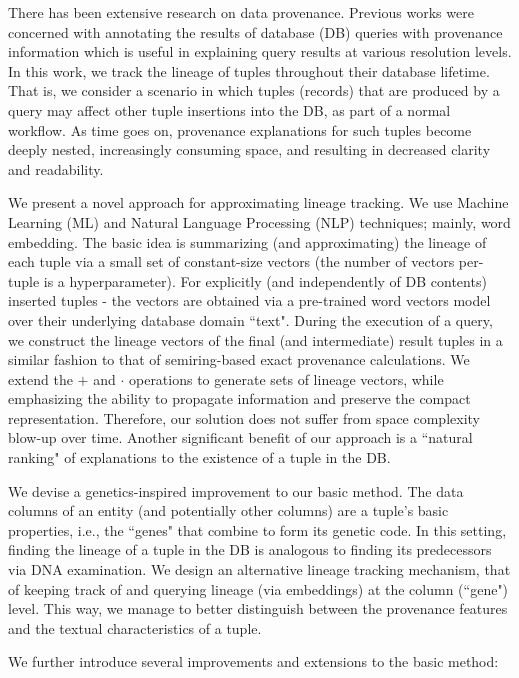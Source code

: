 {There has been extensive research on data provenance. Previous works were concerned with annotating the results of database (DB) queries with provenance information which is useful in explaining query results at various resolution levels. In this work, we track the lineage of tuples throughout their database lifetime. That is, we consider a scenario in which tuples (records) that are produced by a query may affect other tuple insertions into the DB, as part of a normal workflow. As time goes on, provenance explanations for such tuples become deeply nested, increasingly consuming  space, and resulting in decreased clarity and readability.
\par We present a novel approach for approximating lineage tracking. We use Machine Learning (ML) and Natural Language Processing (NLP) techniques; mainly, word embedding. 
The basic idea is summarizing (and approximating) the lineage of each tuple via a small set of constant-size vectors (the number of vectors per-tuple is a hyperparameter). For explicitly (and independently of DB contents)  inserted tuples -  the vectors are obtained via a pre-trained word vectors model over their underlying database domain ``text". During the execution of a query, we construct the lineage vectors of the final (and intermediate) result tuples in a similar fashion to that of semiring-based exact provenance calculations. We extend the $+$ and $\cdot$ operations to generate sets of lineage vectors, while emphasizing the ability to propagate information and preserve the compact representation. Therefore, our solution does not suffer from space complexity blow-up over time. Another significant benefit of our approach is a ``natural ranking" of explanations to the existence of a tuple in the DB.
\par We devise a genetics-inspired improvement to our basic method. The data columns of an entity (and potentially other columns) are a tuple’s basic properties, i.e., the ``genes" that combine to form its genetic code. In this setting, finding the lineage of a tuple in the DB is analogous to finding its predecessors via DNA examination. We design an alternative lineage tracking mechanism, that of keeping track of and querying lineage (via embeddings) at the column (``gene") level. This way, we manage to better distinguish between the provenance features and the textual characteristics of a tuple.
\par We further introduce several improvements and extensions to the basic method:
\begin{itemize}

\end{itemize}}
